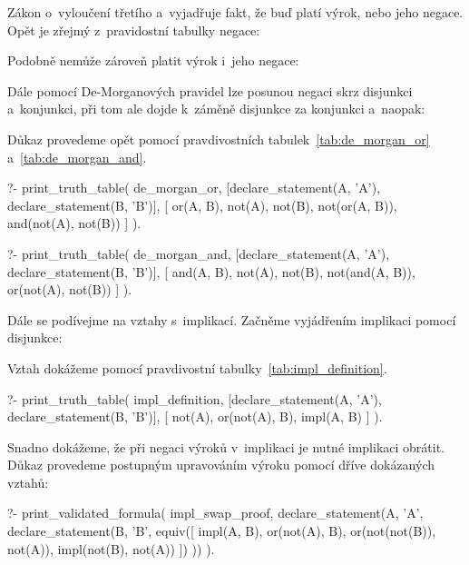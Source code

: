 Zákon o~vyloučení třetího a~vyjadřuje fakt, že buď platí výrok, nebo jeho negace. Opět je zřejmý z~pravidostní tabulky negace:


Podobně nemůže zároveň platit výrok i~jeho negace: 


Dále pomocí De-Morganových pravidel lze posunou negaci skrz disjunkci a~konjunkci, při tom ale dojde k~záměně disjunkce za konjunkci a~naopak:


Důkaz provedeme opět pomocí pravdivostních tabulek~\ref{tab:de_morgan_or} a~\ref{tab:de_morgan_and}.

\begin{prolog}
?- print_truth_table(
	de_morgan_or,
	[declare_statement(A, 'A'), declare_statement(B, 'B')],
	[
		or(A, B),
		not(A),
		not(B),
		not(or(A, B)),
		and(not(A), not(B))
	]
).
\end{prolog}

\begin{prolog}
?- print_truth_table(
	de_morgan_and,
	[declare_statement(A, 'A'), declare_statement(B, 'B')],
	[
		and(A, B),
		not(A),
		not(B),
		not(and(A, B)),
		or(not(A), not(B))
	]
).
\end{prolog}

Dále se podívejme na vztahy s~implikací. Začněme vyjádřením implikaci pomocí disjunkce:


Vztah dokážeme pomocí pravdivostní tabulky~\ref{tab:impl_definition}.

\begin{prolog}
?- print_truth_table(
	impl_definition,
	[declare_statement(A, 'A'), declare_statement(B, 'B')],
	[
		not(A),
		or(not(A), B),
		impl(A, B)
	]
).
\end{prolog}

Snadno dokážeme, že při negaci výroků v~implikaci je nutné implikaci obrátit. Důkaz provedeme postupným upravováním výroku pomocí dříve dokázaných vztahů:

\begin{prolog}
?- print_validated_formula(
	impl_swap_proof,
	declare_statement(A, 'A', declare_statement(B, 'B',
		equiv([
			impl(A, B),
			or(not(A), B),
			or(not(not(B)), not(A)),
			impl(not(B), not(A))
		])
	))
).
\end{prolog}

